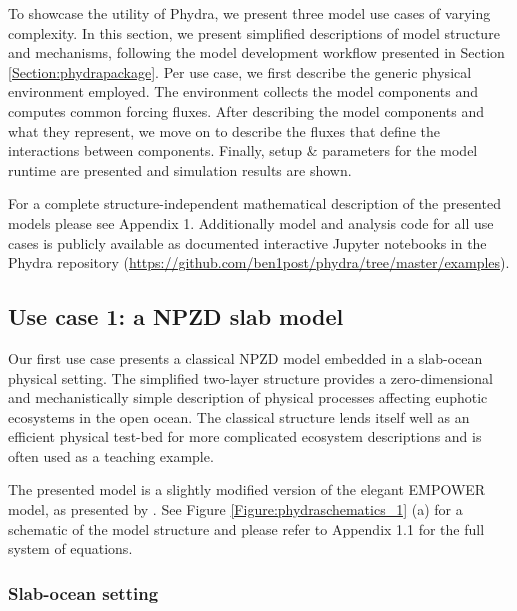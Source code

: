 \documentclass[journal abbreviations, manuscript]{copernicus}
\begin{document}




To showcase the utility of Phydra, we present three model use cases of varying complexity. In this section, we present simplified descriptions of model structure and mechanisms, following the model development workflow presented in Section \ref{Section:phydrapackage}.
Per use case, we first describe the generic physical environment employed. The environment collects the model components and computes common forcing fluxes. After describing the model components and what they represent, we move on to describe the fluxes that define the interactions between components. Finally, setup \& parameters for the model runtime are presented and simulation results are shown.

For a complete structure-independent mathematical description of the presented models please see Appendix 1. Additionally model and analysis code for all use cases is publicly available as documented interactive Jupyter notebooks in the Phydra repository (\url{https://github.com/ben1post/phydra/tree/master/examples}). 

\subsection{Use case 1: a NPZD slab model}
Our first use case presents a classical NPZD model embedded in a slab-ocean physical setting. The simplified two-layer structure provides a zero-dimensional and mechanistically simple description of physical processes affecting euphotic ecosystems in the open ocean. The classical structure lends itself well as an efficient physical test-bed for more complicated ecosystem descriptions and is often used as a teaching example.

The presented model is a slightly modified version of the elegant EMPOWER model, as presented by \citet{Anderson2015c}. 
See Figure \ref{Figure:phydraschematics_1} (a) for a schematic of the model structure and please refer to Appendix 1.1 for the full system of equations.


\subsubsection{Slab-ocean setting} \label{Section:SlabOcean}
\end{document}

